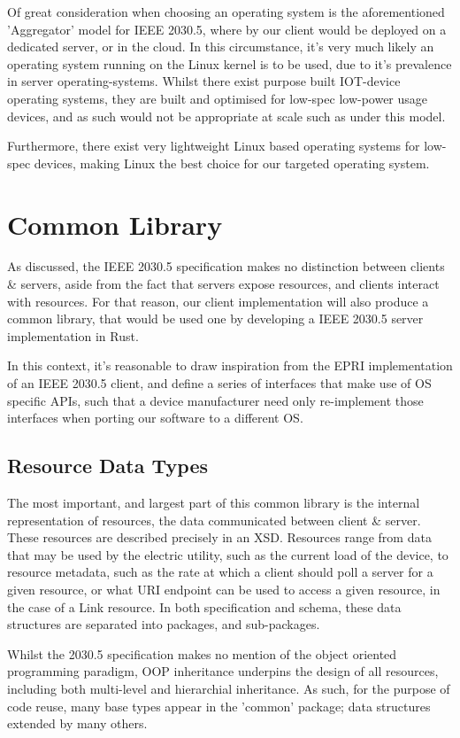 Of great consideration when choosing an operating system is the aforementioned 'Aggregator' model for IEEE 2030.5, where by our client would be deployed on a dedicated server, or in the cloud. In this circumstance, it's very much likely an operating system running on the Linux kernel is to be used, due to it's prevalence in server operating-systems.
Whilst there exist purpose built IOT-device operating systems, they are built and optimised for low-spec low-power usage devices, and as such would not be appropriate at scale such as under this model.

Furthermore, there exist very lightweight Linux based operating systems for low-spec devices, making Linux the best choice for our targeted operating system.

\section{Common Library}
As discussed, the IEEE 2030.5 specification makes no distinction between clients \& servers, aside from the fact that servers expose resources, and clients interact with resources. 
For that reason, our client implementation will also produce a common library, that would be used one by developing a IEEE 2030.5 server implementation in Rust.

In this context, it's reasonable to draw inspiration from the EPRI implementation of an IEEE 2030.5 client, and define a series of interfaces that make use of OS specific APIs, such that a device manufacturer need only re-implement those interfaces when porting our software to a different OS.

\subsection{Resource Data Types}
The most important, and largest part of this common library is the internal representation of resources, the data communicated between client \& server. These resources are described precisely in an XSD.
Resources range from data that may be used by the electric utility, such as the current load of the device, to resource metadata, such as the rate at which a client should poll a server for a given resource, or what URI endpoint can be used to access a given resource, in the case of a Link resource.
In both specification and schema, these data structures are separated into packages, and sub-packages. 

Whilst the 2030.5 specification makes no mention of the object oriented programming paradigm, OOP inheritance underpins the design of all resources, including both multi-level and hierarchial inheritance.
As such, for the purpose of code reuse, many base types appear in the 'common' package; data structures extended by many others.

